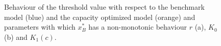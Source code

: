 

\begin{figure}[!htb]
	\begin{subfigmatrix}{3}
	\end{subfigmatrix}
	\caption{Behaviour of the threshold value with respect to the benchmark model (blue) and the capacity optimized model (orange) and parameters with which $x^*_B$ has a non-monotonic behaviour $r$ (a), $K_0$ (b) and $K_1 (c)$.}
	\label{fig:2_x1}
\end{figure}


